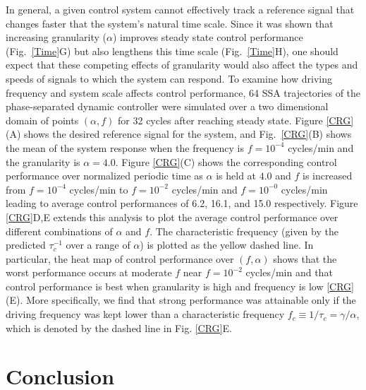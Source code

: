 \documentclass[12pt]{iopart}
\begin{document}
In general, a given control system cannot effectively track a reference signal that changes faster that the system's natural time scale. Since it was shown that increasing granularity ($\alpha$) improves steady state control performance (Fig.\ \ref{Time}G) but also lengthens this time scale (Fig.\ \ref{Time}H), one should expect that these competing effects of granularity would also affect the types and speeds of signals to which the system can respond.
To examine how driving frequency and system scale affects control performance, 64 SSA trajectories of the phase-separated dynamic controller were simulated over a two dimensional domain of points $(\alpha,f)$ for 32 cycles after reaching steady state. 
Figure \ref{CRG}(A) shows the desired reference signal for the system, and Fig.\ \ref{CRG}(B) shows the mean of the system response when the frequency is $f=10^{-4}$ cycles/min and the granularity is $\alpha = 4.0$.  
Figure \ref{CRG}(C) shows the corresponding control performance over normalized periodic time as $\alpha$ is held at $4.0$ and $f$ is increased from $f=10^{-4}$ cycles/min to $f=10^{-2}$ cycles/min and $f=10^{-0}$ cycles/min leading to average control performances of 6.2, 16.1, and 15.0 respectively. 
Figure \ref{CRG}D,E extends this analysis to plot the average control performance over different combinations of $\alpha$ and $f$. 
The characteristic frequency (given by the predicted $\tau_c^{-1}$ over a range of $\alpha$) is plotted as the yellow dashed line.
In particular, the heat map of control performance over $(f,\alpha)$ shows that the worst performance occurs at moderate $f$ near $f=10^{-2}$ cycles/min and that control performance is best when granularity is high and frequency is low \ref{CRG}(E).  More specifically, we find that strong performance was attainable only if the driving frequency was kept lower than a characteristic frequency $f_c \equiv 1 / \tau_c = \gamma/\alpha$, which is denoted by the dashed line in Fig. \ref{CRG}E.


\section{Conclusion}
\end{document}

